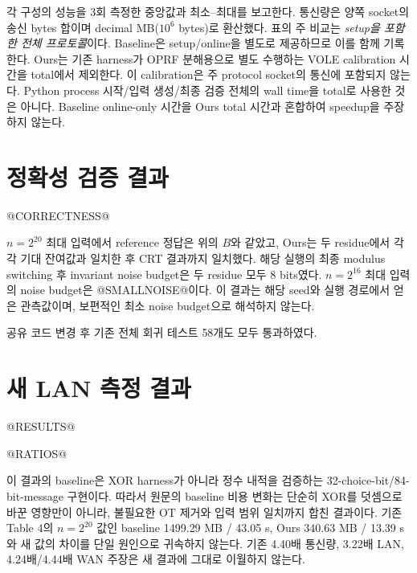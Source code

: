 \documentclass[11pt,a4paper]{article}
\begin{document}
각 구성의 성능을 3회 측정한 중앙값과 최소--최대를 보고한다.
통신량은 양쪽 socket의 송신 bytes 합이며 decimal MB($10^6$ bytes)로 환산했다.
표의 주 비교는 \emph{setup을 포함한 전체 프로토콜}이다.
Baseline은 setup/online을 별도로 제공하므로 이를 함께 기록한다.
Ours는 기존 harness가 OPRF 분해용으로 별도 수행하는 VOLE calibration 시간을 total에서 제외한다.
이 calibration은 주 protocol socket의 통신에 포함되지 않는다.
Python process 시작/입력 생성/최종 검증 전체의 wall time을 total로 사용한 것은 아니다.
Baseline online-only 시간을 Ours total 시간과 혼합하여 speedup을 주장하지 않는다.

\section{정확성 검증 결과}
@CORRECTNESS@

$n=2^{20}$ 최대 입력에서 reference 정답은 위의 $B$와 같았고,
Ours는 두 residue에서 각각 기대 잔여값과 일치한 후 CRT 결과까지 일치했다.
해당 실행의 최종 modulus switching 후 invariant noise budget은 두 residue 모두 8 bits였다.
$n=2^{16}$ 최대 입력의 noise budget은 @SMALLNOISE@이다.
이 결과는 해당 seed와 실행 경로에서 얻은 관측값이며, 보편적인 최소 noise budget으로 해석하지 않는다.

공유 코드 변경 후 기존 전체 회귀 테스트 58개도 모두 통과하였다.

\section{새 LAN 측정 결과}
@RESULTS@

@RATIOS@

이 결과의 baseline은 XOR harness가 아니라 정수 내적을 검증하는 32-choice-bit/84-bit-message 구현이다.
따라서 원문의 baseline 비용 변화는 단순히 XOR를 덧셈으로 바꾼 영향만이 아니라,
불필요한 OT 제거와 입력 범위 일치까지 합친 결과이다.
기존 Table 4의 $n=2^{20}$ 값인 baseline 1499.29 MB / 43.05 s,
Ours 340.63 MB / 13.39 s와 새 값의 차이를 단일 원인으로 귀속하지 않는다.
기존 4.40배 통신량, 3.22배 LAN, 4.24배/4.44배 WAN 주장은 새 결과에 그대로 이월하지 않는다.
\end{document}
